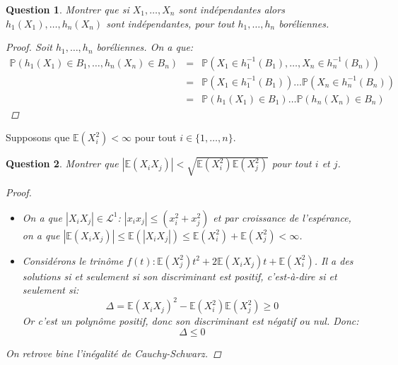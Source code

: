 \documentclass{article}
\theoremstyle{plain}
\newtheorem{question}{Question}
\begin{document}
\begin{question}
	Montrer que si $X_1, \dots, X_n$ sont indépendantes alors $h_1 (X_1), \dots, h_n (X_n)$ sont indépendantes, pour tout $h_1, \dots, h_n$ boréliennes.

	\begin{proof}
		Soit $h_1, \dots, h_n$ boréliennes. On a que:
		\begin{eqnarray*}
			\mathbb{P} (h_1 (X_1) \in B_1, \dots, h_n (X_n) \in B_n) &=& \mathbb{P} (X_1 \in h_1^{-1} (B_1), \dots, X_n \in h_n^{-1} (B_n)) \\
			&=& \mathbb{P} (X_1 \in h_1^{-1} (B_1)) \dots \mathbb{P} (X_n \in h_n^{-1} (B_n)) \\
			&=& \mathbb{P} (h_1 (X_1) \in B_1) \dots \mathbb{P} (h_n (X_n) \in B_n)
		\end{eqnarray*}
	\end{proof}
\end{question}

Supposons que $\mathbb{E} (X_i^2) < \infty$ pour tout $i \in \{1, \dots, n\}$.

\begin{question}
	Montrer que $|\mathbb{E} (X_iX_j)| < \sqrt{\mathbb{E} (X_i^2) \mathbb{E} (X_j^2)}$ pour tout $i$ et $j$.
	\begin{proof}
		\begin{itemize}
			\item On a que $|X_iX_j| \in \mathscr{L}^1$: $|x_ix_j| \leq (x_i^2 + x_j^2)$ et par croissance de l'espérance,
			      on a que $|\mathbb{E} (X_iX_j)| \leq \mathbb{E} (|X_iX_j|) \leq \mathbb{E} (X_i^2) + \mathbb{E} (X_j^2) < \infty$.
			\item Considérons le trinôme $f(t): \mathbb{E}(X_j^2)t^2 + 2\mathbb{E}(X_iX_j)t + \mathbb{E}(X_i^2)$. Il a des solutions si et seulement si son discriminant est positif, c'est-à-dire si et seulement si:
			      \begin{equation*}
				      \Delta = \mathbb{E}(X_iX_j)^2 - \mathbb{E}(X_i^2)\mathbb{E}(X_j^2) \geq 0
			      \end{equation*}
			      Or c'est un polynôme positif, donc son discriminant est négatif ou nul. Donc:
			      \begin{equation*}
				      \Delta \leq 0
			      \end{equation*}
		\end{itemize}

		On retrove bine l'inégalité de Cauchy-Schwarz.
	\end{proof}
\end{question}
\end{document}
